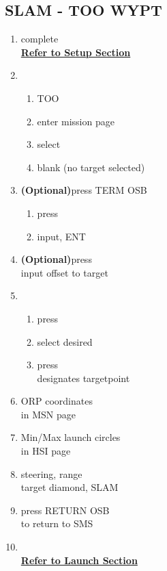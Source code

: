 \documentclass[fontHelvetica, widesubsec]{TechCheck}
\begin{document}
	\subsection{SLAM - TOO WYPT}
	\begin{enumerate}
		\item {}\dotfill complete \\
		\hfill \hyperref[subsec:84setup]{\textbf{Refer to Setup Section}}
		\item {}
		\begin{enumerate}
			\item {}\dotfill TOO
			\item {}\dotfill enter mission page
			\item {}\dotfill select
			\item {}\dotfill blank (no target selected)
		\end{enumerate}
		\item {} \textbf{(Optional)}\dotfill press TERM OSB
		\begin{enumerate}
			\item {}\dotfill press
			\item {}\dotfill input, ENT
		\end{enumerate}
		\item {} \textbf{(Optional)}\dotfill press \\
		\hfill input offset to target
		\item {}
		\begin{enumerate}
			\item {}\dotfill press
			\item {}\dotfill select desired
			\item {}\dotfill press \\
			\hfill designates targetpoint
		\end{enumerate}
		\item {}\dotfill ORP coordinates\\
		\hfill  in MSN page
		\item {}\dotfill Min/Max launch circles\\
		\hfill in HSI page
		\item {}\dotfill steering, range \\
		\hfill  target diamond, SLAM
		\item {}\dotfill press RETURN OSB \\
		\hfill to return to SMS
		\item {} \\
		\hfill \hyperref[subsec:84launch]{\textbf{Refer to Launch Section}}
	\end{enumerate}
\end{document}
